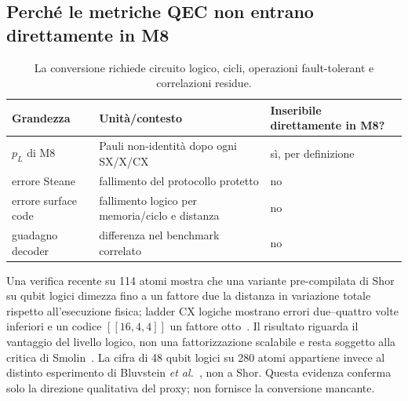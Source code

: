 \begin{onehalfspace}
\subsection{Perché le metriche QEC non entrano direttamente in M8}
\label{app:shor_metriche}

\begin{table}[H]
\centering
\small
\begin{tabular}{p{}p{}p{}}
\toprule
\textbf{Grandezza} & \textbf{Unità/contesto} & \textbf{Inseribile direttamente in M8?} \\
\midrule
$p_L$ di M8 & Pauli non-identità dopo ogni SX/X/CX & sì, per definizione \\
errore Steane & fallimento del protocollo protetto & no \\
errore surface code & fallimento logico per memoria/ciclo e distanza & no \\
guadagno decoder & differenza nel benchmark correlato & no \\
\bottomrule
\end{tabular}
\caption[Contratto tra risultati QEC e curva M8]{La conversione richiede
circuito logico, cicli, operazioni fault-tolerant e correlazioni residue.}
\label{tab:decoder_su_shor}
\end{table}

Una verifica recente su 114 atomi mostra che una variante pre-compilata
di Shor su qubit logici dimezza fino a un fattore due la distanza in
variazione totale rispetto all'esecuzione fisica; ladder CX logiche
mostrano errori due--quattro volte inferiori e un codice $[[16,4,4]]$ un
fattore otto~\cite{rines2025}. Il risultato riguarda il vantaggio del
livello logico, non una fattorizzazione scalabile e resta soggetto alla
critica di Smolin~\cite{smolin2013}. La cifra di 48 qubit logici su 280
atomi appartiene invece al distinto esperimento di Bluvstein
\emph{et al.}~\cite{bluvstein2024}, non a Shor. Questa evidenza conferma
solo la direzione qualitativa del proxy; non fornisce la conversione
mancante.

\end{onehalfspace}
